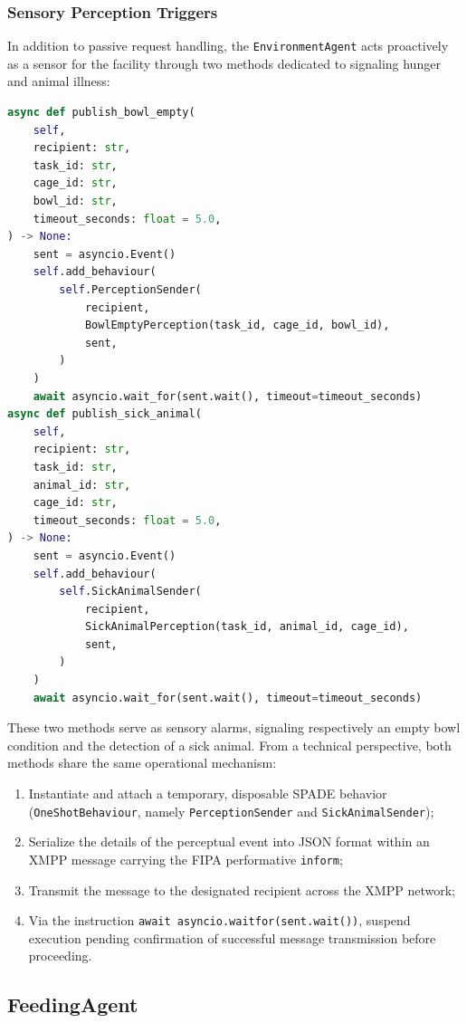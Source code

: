 \documentclass{article}
\renewcommand{\_}{\oldtextunderscore\allowbreak}
\begin{document}
\subsubsection{Sensory Perception Triggers}
In addition to passive request handling, the \texttt{EnvironmentAgent} acts proactively as a sensor for the facility through two methods dedicated to signaling hunger and animal illness:
\begin{lstlisting}[language=Python, caption={Perception publishing methods in \texttt{EnvironmentAgent}}]
async def publish_bowl_empty(
    self,
    recipient: str,
    task_id: str,
    cage_id: str,
    bowl_id: str,
    timeout_seconds: float = 5.0,
) -> None:
    sent = asyncio.Event()
    self.add_behaviour(
        self.PerceptionSender(
            recipient,
            BowlEmptyPerception(task_id, cage_id, bowl_id),
            sent,
        )
    )
    await asyncio.wait_for(sent.wait(), timeout=timeout_seconds)
async def publish_sick_animal(
    self,
    recipient: str,
    task_id: str,
    animal_id: str,
    cage_id: str,
    timeout_seconds: float = 5.0,
) -> None:
    sent = asyncio.Event()
    self.add_behaviour(
        self.SickAnimalSender(
            recipient,
            SickAnimalPerception(task_id, animal_id, cage_id),
            sent,
        )
    )
    await asyncio.wait_for(sent.wait(), timeout=timeout_seconds)
\end{lstlisting}
These two methods serve as sensory alarms, signaling respectively an empty bowl condition and the detection of a sick animal. From a technical perspective, both methods share the same operational mechanism:
\begin{enumerate}
    \item Instantiate and attach a temporary, disposable SPADE behavior (\texttt{OneShotBehaviour}, namely \texttt{PerceptionSender} and \texttt{SickAnimalSender});
    \item Serialize the details of the perceptual event into JSON format within an XMPP message carrying the FIPA performative \texttt{inform};
    \item Transmit the message to the designated recipient across the XMPP network;
    \item Via the instruction \texttt{await asyncio.wait\_for(sent.wait())}, suspend execution pending confirmation of successful message transmission before proceeding.
\end{enumerate}



\subsection{FeedingAgent}
\end{document}
